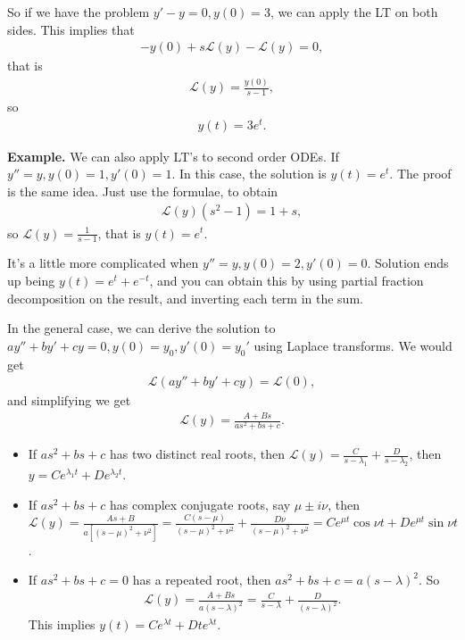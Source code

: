 \documentclass{article}
\newcommand{\LL}{\mathcal{L}}
\begin{document}
So if we have the problem $y' - y = 0, y(0) = 3$, we can apply the LT on both sides.  This implies that
\begin{align*}
  - y(0) + s \LL(y) - \LL(y) = 0,
\end{align*}
that is
\begin{align*}
  \LL(y) = \frac{y(0)}{s-1},
\end{align*}
so 
\begin{align*}
  y(t) = 3 e^t.
\end{align*}

{\bf Example.} We can also apply LT's to second order ODEs.  If $y'' = y, y(0) = 1, y'(0) = 1$.  In this case, the solution is $y(t) = e^t$.  The proof is the same idea.  Just use the formulae, to obtain
\begin{align*}
  \LL (y) (s^2 - 1) = 1 + s,
\end{align*}
so $\LL(y) = \frac{1}{s-1}$, that is $y(t) = e^t$.

It's a little more complicated when $y'' = y, y(0) = 2, y'(0) = 0$.  Solution ends up being $y(t) = e^t + e^{-t}$, and you can obtain this by using partial fraction decomposition on the result, and inverting each term in the sum.

In the general case, we can derive the solution to $ay'' + by' + cy = 0, y(0) = y_0, y'(0) = y_0'$ using Laplace transforms.  We would get
\begin{align*}
  \LL \left( a y'' + by' + cy  \right) = \LL(0),
\end{align*}
and simplifying we get
\begin{align*}
  \LL(y) = \frac{A + Bs}{as^2 + bs + c}.
\end{align*}

\begin{itemize}
  \item If $a s^2 + bs + c$ has two distinct real roots, then $\LL(y) = \frac{C}{s - \lambda_1} + \frac{D}{s - \lambda_2}$, then $y = C e^{\lambda_1 t} + D e^{\lambda_2 t}$.
  \item If $a s^2 + bs + c$ has complex conjugate roots, say $\mu \pm i \nu$, then $\LL(y) = \frac{As + B}{a \left[ (s - \mu)^2 + \nu^2 \right]} = \frac{C (s - \mu)}{(s - \mu)^2 + \nu^2} + \frac{D \nu}{(s - \mu)^2 + \nu^2} = C e^{\mu t} \cos \nu t + D e^{\mu t} \sin \nu t$.
  \item If $as^2 + bs + c = 0$ has a repeated root, then $as^2 + bs + c = a (s - \lambda)^2$.  So
    \begin{align*}
      \LL(y) = \frac{A + Bs}{a (s - \lambda)^2} = \frac{C}{s - \lambda} + \frac{D}{(s - \lambda)^2}.
    \end{align*}
    This implies $y(t) = C e^{\lambda t} + Dt e^{\lambda t}$.
\end{itemize}
\end{document}
